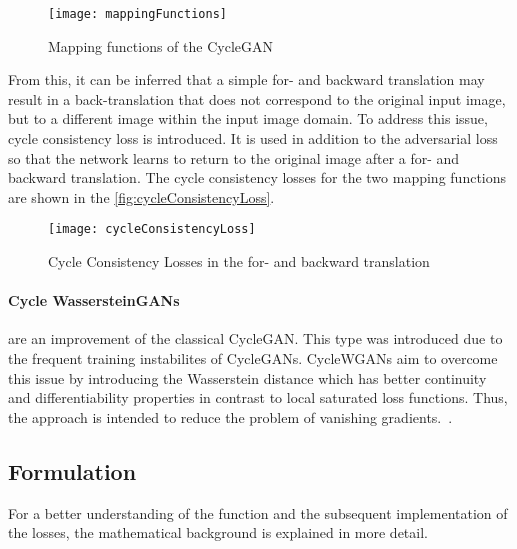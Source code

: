 \documentclass[fleqn,10pt]{SelfArx} %
\begin{document}
\begin{figure} \centering 
	\texttt{[image: mappingFunctions]}
	\caption{Mapping functions of the Cycle\ac{GAN}~\cite{image-to-image-ccan}}
	\label{fig:mappingFunctions}
\end{figure}

From this, it can be inferred that a simple for- and backward translation may result in a back-translation that does not correspond to the original input image, but to a different image within the input image domain. To address this issue, cycle consistency loss is introduced. It is used in addition to the adversarial loss so that the network learns to return to the original image after a for- and backward translation. The cycle consistency losses for the two mapping functions are shown in the \autoref{fig:cycleConsistencyLoss}.~\cite{image-to-image-ccan}

\begin{figure*}[htb] \centering 
	\texttt{[image: cycleConsistencyLoss]}
	\caption{Cycle Consistency Losses in the for- and backward translation~\cite{image-to-image-ccan}}
	\label{fig:cycleConsistencyLoss}
\end{figure*}

\paragraph{Cycle Wasserstein\ac{GAN}s} are an improvement of the classical Cycle\ac{GAN}. This type was introduced due to the frequent training instabilites of Cycle\ac{GAN}s. CycleW\ac{GAN}s aim to overcome this issue by introducing the Wasserstein distance which has better continuity and differentiability properties in contrast to local saturated loss functions. Thus, the approach is intended to reduce the problem of vanishing gradients.~\cite{wgan-improvement}.

\subsection{Formulation}
For a better understanding of the function and the subsequent implementation of the losses, the mathematical background is explained in more detail.
\end{document}
